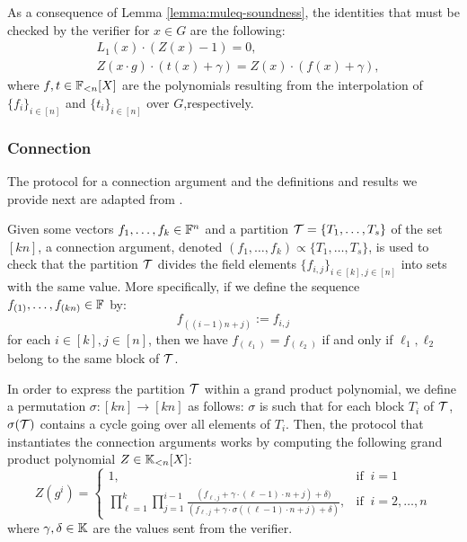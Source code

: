 As a consequence of Lemma \ref{lemma:muleq-soundness}, the identities that must be checked by the verifier for $x \in G$ are the following: 
\begin{align} \label{eq:permutation-Z}
&L_1(x) \cdot (Z(x) - 1) = 0, \\
&Z(x \cdot g) \cdot (t(x) + \gamma) = Z(x) \cdot (f(x) + \gamma),
\end{align}
where $f,t \in \mathbb{F}_{<n}[X]$ are the polynomials resulting from the interpolation of $\{f_i\}_{i\in[n]}$ and $\{t_i\}_{i\in[n]}$ over $G$,respectively.




\subsubsection*{Connection}

The protocol for a connection argument and the definitions and results we provide next are adapted from \cite{EPRINT:GabWilCio19}.

Given some vectors $f_1,\dots,f_k \in \mathbb{F}^n$ and a partition $\mathcal{T} = \{T_1,\dots,T_s\}$ of the set $[kn]$, a connection argument, denoted $(f_1,\dots,f_k) \propto \{T_1,\dots,T_s\}$, is used to check that the partition $\mathcal{T}$ divides the field elements $\{f_{i,j}\}_{i\in[k],j\in[n]}$ into sets with the same value. More specifically, if we define the sequence $f_{(1)},\dots,f_{(kn)} \in \mathbb{F}$ by:
\[
  f_{((i-1)n + j)} := f_{i,j}
\]
for each $i \in [k], j \in [n]$, then we have $f_{(\ell_1)} = f_{(\ell_2)}$ if and only if $\ell_1,\ell_2$ belong to the same block of $\mathcal{T}$. 

In order to express the partition $\mathcal{T}$ within a grand product polynomial, we define a permutation $\sigma\colon [kn] \to [kn]$ as follows: $\sigma$ is such that for each block $T_i$ of $\mathcal{T}$, $\sigma(\mathcal{T})$ contains a cycle going over all elements of $T_i$. Then, the protocol that instantiates the connection arguments works by computing the following grand product polynomial $Z \in \mathbb{K}_{<n}[X]$:
\[
  Z(g^i) = 
  \begin{cases} 
  1, & \text{if }~ i=1 \\ 
  \displaystyle\prod_{\ell=1}^{k}\prod_{j=1}^{i-1} \frac{(f_{\ell,j} + \gamma \cdot (\ell-1)\cdot n +j) + \delta)}{(f_{\ell,j} + \gamma \cdot \sigma((\ell-1)\cdot n +j) + \delta)}, & \text{if }~ i = 2, \dots, n
  \end{cases} 
\]
where $\gamma,\delta \in \mathbb{K}$ are the values sent from the verifier. 


